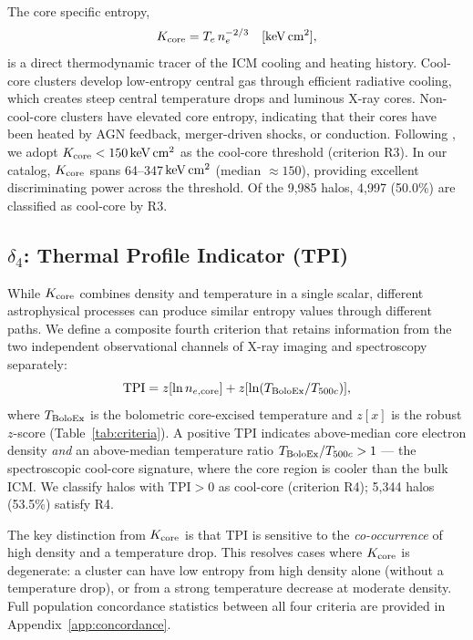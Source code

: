 \documentclass[12pt]{article}
\newcommand{\Kcore}{K_{\rm core}}
\newcommand{\TPI}{\mathrm{TPI}}
\newcommand{\deltaiv}{\delta_4}
\newcommand{\kevcm}{{\rm keV\,cm^2}}
\begin{document}
The core specific entropy,
\begin{equation}
  \Kcore = T_e\,n_e^{-2/3}\quad [\kevcm],
\end{equation}
is a direct thermodynamic tracer of the ICM cooling and heating history.
Cool-core clusters develop low-entropy central gas through efficient radiative cooling,
which creates steep central temperature drops and luminous X-ray cores.
Non-cool-core clusters have elevated core entropy, indicating that their cores have been
heated by AGN feedback, merger-driven shocks, or conduction.
Following \citet{hudson2010}, we adopt $\Kcore < 150\,\kevcm$ as the cool-core threshold
(criterion R3).  In our catalog, $\Kcore$ spans 64--347\,$\kevcm$ (median $\approx 150$),
providing excellent discriminating power across the threshold.
Of the 9{,}985 halos, 4{,}997 (50.0\%) are classified as cool-core by R3.

\subsection{\texorpdfstring{$\deltaiv$}{delta4}: Thermal Profile Indicator (TPI)}
\label{sec:tpi_def}

While $\Kcore$ combines density and temperature in a single scalar, different astrophysical
processes can produce similar entropy values through different paths.  We define a composite
fourth criterion that retains information from the two independent observational channels of
X-ray imaging and spectroscopy separately:
\begin{equation}
  \TPI = z[\ln n_{e,\rm core}] + z[\ln(T_{\rm BoloEx}/T_{500c})],
  \label{eq:tpi}
\end{equation}
where $T_{\rm BoloEx}$ is the bolometric core-excised temperature and $z[x]$ is the
robust $z$-score (Table~\ref{tab:criteria}).
A positive TPI indicates above-median core electron density \emph{and} an above-median
temperature ratio $T_{\rm BoloEx}/T_{500c} > 1$ --- the spectroscopic cool-core signature,
where the core region is cooler than the bulk ICM.  We classify halos with $\TPI > 0$
as cool-core (criterion R4); 5{,}344 halos (53.5\%) satisfy R4.

The key distinction from $\Kcore$ is that TPI is sensitive to the \emph{co-occurrence}
of high density and a temperature drop.  This resolves cases where $K_{\rm core}$ is
degenerate: a cluster can have low entropy from high density alone (without a temperature
drop), or from a strong temperature decrease at moderate density.
Full population concordance statistics between all four criteria are provided in
Appendix~\ref{app:concordance}.
\end{document}
